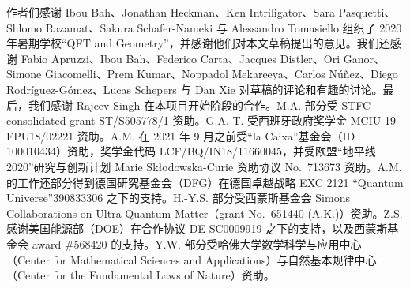 作者们感谢 Ibou Bah、Jonathan Heckman、Ken Intriligator、Sara Pasquetti、Shlomo Razamat、Sakura Schafer-Nameki 与 Alessandro Tomasiello 组织了 2020 年暑期学校“QFT and Geometry”，并感谢他们对本文草稿提出的意见。我们还感谢 Fabio Apruzzi、Ibou Bah、Federico Carta、Jacques Distler、Ori Ganor、Simone Giacomelli、Prem Kumar、Noppadol Mekareeya、Carlos Núñez、Diego Rodríguez-Gómez、Lucas Schepers 与 Dan Xie 对草稿的评论和有趣的讨论。最后，我们感谢 Rajeev Singh 在本项目开始阶段的合作。M.A. 部分受 STFC consolidated grant ST/S505778/1 资助。G.A.-T. 受西班牙政府奖学金 MCIU-19-FPU18/02221 资助。A.M. 在 2021 年 9 月之前受“la Caixa”基金会（ID 100010434）资助，奖学金代码 LCF/BQ/IN18/11660045，并受欧盟“地平线 2020”研究与创新计划 Marie Skłodowska-Curie 资助协议 No.\ 713673 资助。A.M. 的工作还部分得到德国研究基金会（DFG）在德国卓越战略 EXC 2121 “Quantum Universe”390833306 之下的支持。H.-Y.S. 部分受西蒙斯基金会 Simons Collaborations on Ultra-Quantum Matter（grant No.\ 651440 (A.K.)）资助。Z.S. 感谢美国能源部（DOE）在合作协议 DE-SC0009919 之下的支持，以及西蒙斯基金会 award \#568420 的支持。Y.W. 部分受哈佛大学数学科学与应用中心（Center for Mathematical Sciences and Applications）与自然基本规律中心（Center for the Fundamental Laws of Nature）资助。

